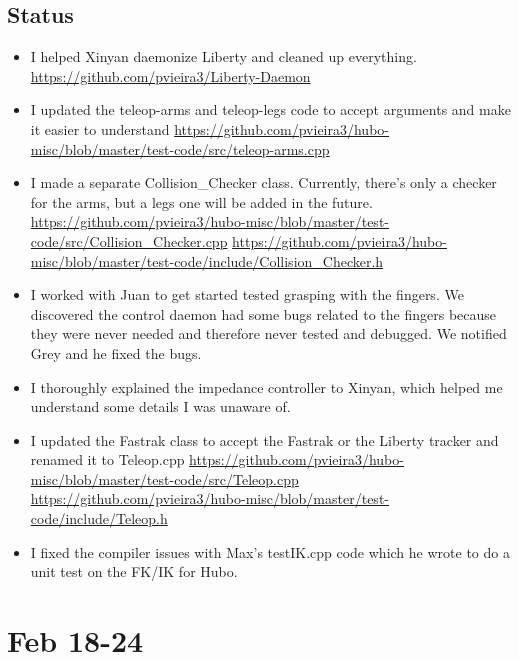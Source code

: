 \documentclass[letterpaper, 10 pt]{report}
\begin{document}
\subsection*{Status}
\begin{itemize}
\item I helped Xinyan daemonize Liberty and cleaned up everything.
\url{https://github.com/pvieira3/Liberty-Daemon}
\item I updated the teleop-arms and teleop-legs code to accept arguments and make it
easier to understand
\url{https://github.com/pvieira3/hubo-misc/blob/master/test-code/src/teleop-arms.cpp}
\item I made a separate Collision\_Checker class. Currently, there's only a checker for
the arms, but a legs one will be added in the future.
\url{https://github.com/pvieira3/hubo-misc/blob/master/test-code/src/Collision\_Checker.cpp}
\url{https://github.com/pvieira3/hubo-misc/blob/master/test-code/include/Collision\_Checker.h}
\item I worked with Juan to get started tested grasping with the fingers. We
discovered the control daemon had some bugs related to the fingers because they
were never needed and therefore never tested and debugged. We notified Grey and
he fixed the bugs.
\item I thoroughly explained the impedance controller to Xinyan, which helped me
understand some details I was unaware of.
\item I updated the Fastrak class to accept the Fastrak or the Liberty tracker and
renamed it to Teleop.cpp
\url{https://github.com/pvieira3/hubo-misc/blob/master/test-code/src/Teleop.cpp}
\url{https://github.com/pvieira3/hubo-misc/blob/master/test-code/include/Teleop.h}
\item I fixed the compiler issues with Max's testIK.cpp code which he wrote to do a
unit test on the FK/IK for Hubo.
\end{itemize}

\section*{Feb 18-24}
\end{document}
